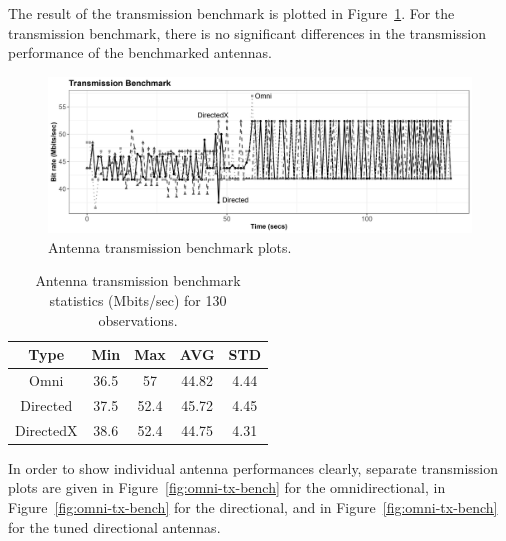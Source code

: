 \documentclass[12pt, oneandhalf, chaparabic, sees, ms]{metu}
\begin{document}
\newpage

The result of the transmission benchmark is plotted in Figure~\ref{fig:tx-bench}. 
For the transmission benchmark, there is no significant differences in the transmission performance of the benchmarked antennas.

\vspace{2cm}

\begin{figure}[!htbp]
 \begin{center}
  \includegraphics[width=\textwidth]{tx-graph2-bw.png}
 \end{center}
 \caption{Antenna transmission benchmark plots.}
  \label{fig:tx-bench}
\end{figure}

\vspace{2cm}

\renewcommand{\arraystretch}{1.2}%
\begin{table}[H]
\begin{center}
\caption{Antenna transmission benchmark statistics (Mbits/sec) for 130 observations. }
\label{tab:tx-stat}
\begin{adjustbox}{max width=\textwidth}
\begin{tabular}{|c | c | c | c | c |}
\hline
\rowcolor{lightgray}
\textbf{Type} & \textbf{Min} & \textbf{Max} & \textbf{AVG} & \textbf{STD}\tabularnewline
\hline \hline 
\cellcolor{lightgray} Omni       &  36.5      &  57        &   44.82     &  4.44       \tabularnewline \hline
\cellcolor{lightgray} Directed   &  37.5      &  52.4      &   45.72     &  4.45      \tabularnewline \hline
\cellcolor{lightgray} DirectedX  &  38.6      &  52.4      &   44.75     &  4.31      \tabularnewline \hline
\end{tabular}
\end{adjustbox}
\end{center}
\end{table}
\renewcommand{\arraystretch}{1}%


\newpage
In order to show individual antenna performances clearly, separate transmission plots are given in Figure~\ref{fig:omni-tx-bench} for the omnidirectional, 
in Figure~\ref{fig:omni-tx-bench} for the directional, and in Figure~\ref{fig:omni-tx-bench} for the tuned directional antennas. 
\end{document}

